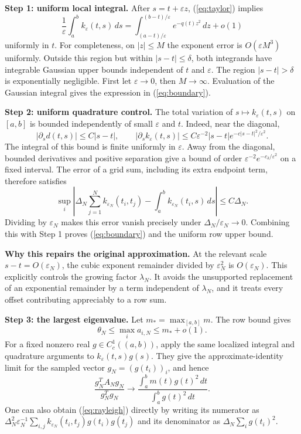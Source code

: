 \documentclass[10pt,a4paper]{article}
\newcommand{\eps}{\varepsilon}
\newcommand{\pageheading}[2]{\newpage{\small\color{muted}#1}\par\vspace{2pt}{\LARGE\bfseries\color{ink}#2}\par\vspace{7pt}}
\begin{document}
\textbf{Step 1: uniform local integral.} After $s=t+\eps z$, (\ref{eq:taylor}) implies
\begin{equation}\label{eq:localintegral}
 \frac1\eps\int_a^b k_\eps(t,s)\,ds
 =\int_{(a-t)/\eps}^{(b-t)/\eps}e^{-q(t)z^2}\,dz+o(1)
\end{equation}
uniformly in $t$. For completeness, on $|z|\le M$ the exponent error is $O(\eps M^3)$ uniformly. Outside this region but within $|s-t|\le\delta$, both integrands have integrable Gaussian upper bounds independent of $t$ and $\eps$. The region $|s-t|>\delta$ is exponentially negligible. First let $\eps\to0$, then $M\to\infty$. Evaluation of the Gaussian integral gives the expression in (\ref{eq:boundary}).

\textbf{Step 2: uniform quadrature control.} The total variation of $s\mapsto k_\eps(t,s)$ on $[a,b]$ is bounded independently of small $\eps$ and $t$. Indeed, near the diagonal,
\[
 |\partial_s d(t,s)|\le C|s-t|,\qquad
 |\partial_s k_\eps(t,s)|
 \le C\eps^{-2}|s-t|e^{-c|s-t|^2/\eps^2}.
\]
The integral of this bound is finite uniformly in $\eps$. Away from the diagonal, bounded derivatives and positive separation give a bound of order $\eps^{-2}e^{-c_\delta/\eps^2}$ on a fixed interval. The error of a grid sum, including its extra endpoint term, therefore satisfies
\[
 \sup_i\left|\Delta_N\sum_{j=1}^N k_{\eps_N}(t_i,t_j)
 -\int_a^b k_{\eps_N}(t_i,s)\,ds\right|\le C\Delta_N.
\]
Dividing by $\eps_N$ makes this error vanish precisely under $\Delta_N/\eps_N\to0$. Combining this with Step 1 proves (\ref{eq:boundary}) and the uniform row upper bound.

\textbf{Why this repairs the original approximation.} At the relevant scale $s-t=O(\eps_N)$, the cubic exponent remainder divided by $\eps_N^2$ is $O(\eps_N)$. This explicitly controls the growing factor $\lambda_N$. It avoids the unsupported replacement of an exponential remainder by a term independent of $\lambda_N$, and it treats every offset contributing appreciably to a row sum.

\pageheading{07 / PROOF, PART II}{From mass to the Perron maximum}
\textbf{Step 3: the largest eigenvalue.} Let $m_* =\max_{[a,b]}m$. The row bound gives
\[
 \theta_N\le\max_i a_{i,N}\le m_*+o(1).
\]
For a fixed nonzero real $g\in C_c^1((a,b))$, apply the same localized integral and quadrature arguments to $k_\eps(t,s)g(s)$. They give the approximate-identity limit for the sampled vector $g_N=(g(t_i))_i$, and hence
\begin{equation}\label{eq:rayleigh}
 \frac{g_N^TA_Ng_N}{g_N^Tg_N}
 \longrightarrow
 \frac{\int_a^b m(t)g(t)^2\,dt}{\int_a^b g(t)^2\,dt}.
\end{equation}
One can also obtain (\ref{eq:rayleigh}) directly by writing its numerator as
$\Delta_N^2\eps_N^{-1}\sum_{i,j}k_{\eps_N}(t_i,t_j)g(t_i)g(t_j)$
and its denominator as $\Delta_N\sum_i g(t_i)^2$.
\end{document}
